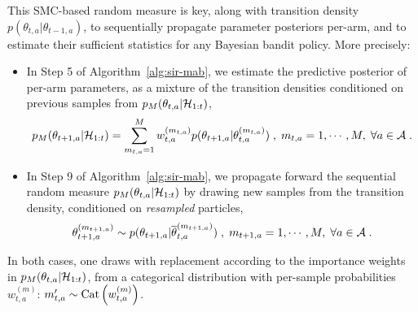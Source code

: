 This SMC-based random measure is key,
along with transition density $p(\theta_{t,a}|\theta_{t-1,a})$,
to sequentially propagate parameter posteriors per-arm,
and to estimate their sufficient statistics for any Bayesian bandit policy.
More precisely:
\begin{itemize}
	\item In Step 5 of Algorithm~\ref{alg:sir-mab},
	we estimate the predictive posterior of per-arm parameters,
	as a mixture of the transition densities conditioned on previous samples from $p_M(\theta_{t,a}|\mathcal{H}_{1:t})$, 
	\begin{equation}
		p_M(\theta_{t+1,a}|\mathcal{H}_{1:t}) = \sum_{m_{t,a}=1}^{M} w_{t,a}^{(m_{t,a})} p(\theta_{t+1,a}|\theta_{t,a}^{(m_{t,a})}) \; , \; m_{t,a}=1,\cdots, M, \; \forall a\in \mathcal{A} \; .
		\label{eq:smc_parameter_predictive_posterior}
	\end{equation}
	
	\item In Step 9 of Algorithm~\ref{alg:sir-mab},
	we propagate forward the sequential random measure $p_M(\theta_{t,a}|\mathcal{H}_{1:t})$
	by drawing new samples from the transition density, conditioned on \textit{resampled} particles, \ie
	\begin{equation}
		\theta_{t+1,a}^{(m_{t+1,a})} \sim p(\theta_{t+1,a}|\overline{\theta}_{t,a}^{(m_{t+1,a})}) \; , \; m_{t+1,a}=1,\cdots, M, \; \forall a\in \mathcal{A} \; .
	\end{equation}
\end{itemize}
In both cases, one draws with replacement according to the importance weights in $p_M(\theta_{t,a}|\mathcal{H}_{1:t})$,
\ie from a categorical distribution with per-sample probabilities $w_{t,a}^{(m)}$: $m_{t,a}^\prime \sim {\rm Cat}\left( w_{t,a}^{(m)}\right)$.

